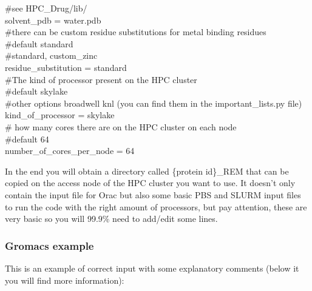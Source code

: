 {					\#see HPC\_Drug/lib/\\
					solvent\_pdb = water.pdb\\
					$\ $\\
					\#there can be custom residue substitutions for metal binding residues\\
					\#default standard\\
					\#standard, custom\_zinc\\
					residue\_substitution = standard\\
					$\ $\\
					\#The kind of processor present on the HPC cluster\\
					\#default skylake\\
					\#other options broadwell knl (you can find them in the important\_lists.py file)\\
					kind\_of\_processor = skylake\\
					$\ $\\
					\# how many cores there are on the HPC cluster on each node\\
					\#default 64\\
					number\_of\_cores\_per\_node = 64}
				
					In the end you will obtain a directory called \{protein id\}\_REM that can be copied on the access node of the HPC cluster you want to use. It doesn't only contain the input file for Orac\cite{orac} but also some basic PBS and SLURM input files to run the code with the right amount of processors, but pay attention, these are very basic so you will 99.9\% need to add/edit some lines.
								
				\subsubsection*{Gromacs example}
				
					This is an example of correct input with some explanatory comments (below it you will find more information):
				
